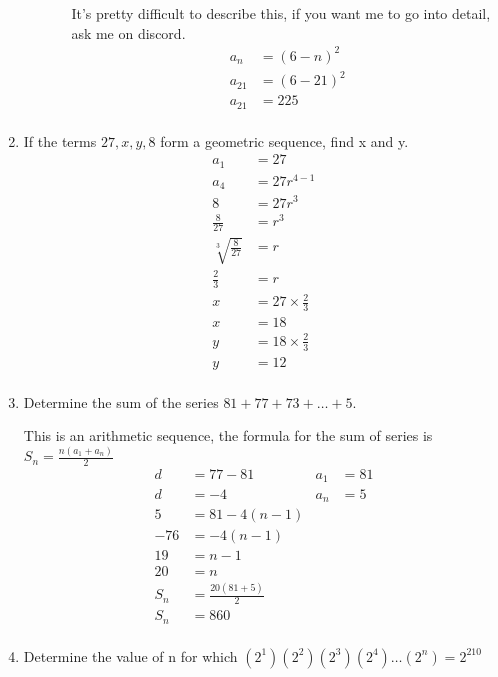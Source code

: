 \documentclass[paper=a4, fontsize=11pt]{scrartcl}
\begin{document}
\begin{enumerate}[resume]
\begin{enumerate}
\begin{enumerate}
            It's pretty difficult to describe this, if you want me to go into detail, ask me on discord.
            \begin{align*}
                a_n&=(6-n)^2\\
                a_{21}&=(6-21)^2\\
                a_{21}&=225\\
            \end{align*}
        \end{enumerate}
    \end{enumerate}
    \item If the terms $27,x,y,8$ form a geometric sequence, find x and y.
    \begin{align*}
        a_1&=27\\
        a_4&=27r^{4-1}\\
        8&=27r^3\\
        \frac{8}{27}&=r^3\\
        \sqrt[3]{\frac{8}{27}}&=r\\
        \frac{2}{3}&=r\\
        x&=27\times \frac{2}{3}\\
        x&=18\\
        y&=18\times \frac{2}{3}\\
        y&=12\\
    \end{align*}
    \item Determine the sum of the series $81+77+73+\ldots +5$.
    
    This is an arithmetic sequence, the formula for the sum of series is $S_n=\frac{n(a_1+a_n)}{2}$
    \begin{align*}
        d&=77-81&a_1&=81\\
        d&=-4&a_n&=5\\
        5&=81-4(n-1)\\
        -76&=-4(n-1)\\
        19&=n-1\\
        20&=n\\
        S_n&=\frac{20(81+5)}{2}\\
        S_n&=860\\
    \end{align*}
    \item Determine the value of n for which $(2^1)(2^2)(2^3)(2^4)\ldots(2^n)=2^210$
    

\end{enumerate}
\end{document}
